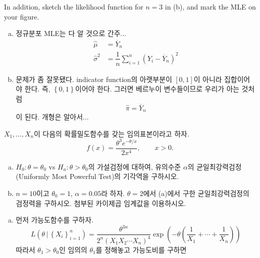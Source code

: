 \documentclass[answers]{exam}
\begin{document}
\begin{questions}
\begin{enumerate}[(a)]
   \end{enumerate}
   In addition, sketch the likelihood function for $n=3$ in (b), and mark the MLE on your figure.
   \begin{solution}
    \begin{enumerate}[(a)]
      \item 정규분포 MLE는 다 알 것으로 간주...
      \begin{align}
        \widehat{\mu} &= \overline{Y}_{n}\\
        \widehat{\sigma}^{2} &= \dfrac{1}{n}\sum_{i=1}^{n}\left(Y_{i}-\overline{Y}_{n}\right)^{2}
      \end{align}
      \item 문제가 좀 잘못됐다. indicator function의 아랫부분이 $[0,1]$이 아니라 집합이어야 한다. 즉, $\left\{0,1\right\}$이어야 한다. 그러면 베르누이 변수들이므로 우리가 아는 것처럼
      \begin{equation}
        \widehat{\pi}=\overline{Y}_{n}
      \end{equation}
      이 된다. 개형은 알아서...
    \end{enumerate}
   \end{solution}
   \question
   $X_{1},\ldots,X_{n}$이 다음의 확률밀도함수를 갖는 임의표본이라고 하자.
   $$
    f\left(x\right)=\dfrac{\theta^{3}e^{-\theta/x}}{2x^{4}},\qquad x>0.
   $$
   \begin{enumerate}[(a)]
    \item $H_{0}:\theta=\theta_{0}$ vs $H_{a}:\theta>\theta_{0}$의 가설검정에 대하여, 유의수준 $\alpha$의 균일최강력검정 (Uniformly Most Powerful Test)의 기각역을 구하시오.
    \item $n=10$이고 $\theta_{0}=1$, $\alpha=0.05$라 하자. $\theta=2$에서 (a)에서 구한 균일최강력검정의 검정력을 구하시오. 첨부된 카이제곱 임계값을 이용하시오.
   \end{enumerate}
   \begin{solution}
    \begin{enumerate}[(a)]
      \item 먼저 가능도함수를 구하자.
      \begin{equation}
        L\left(\theta\,|\,\left\{X_{i}\right\}_{i=1}^{n}\right) = \dfrac{\theta^{3n}}{2^{n}\left(X_{1}X_{2}\cdots X_{n}\right)^{4}}\exp\left(-\theta\left(\dfrac{1}{X_{1}}+\cdots+\dfrac{1}{X_{n}}\right)\right)
      \end{equation}
      따라서 $\theta_{1}>\theta_{0}$인 임의의 $\theta_{1}$를 정해놓고 가능도비를 구하면
      \begin{align}

\end{align}
\end{enumerate}
\end{solution}
\end{questions}
\end{document}
